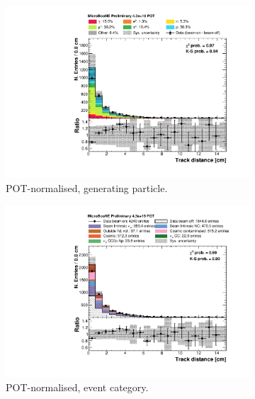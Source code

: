 \begin{figure}[htbp]
\centering
  \begin{subfigure}{0.49\textwidth}
    \includegraphics[width=\linewidth]{figures/h_track_distance_pdg.pdf}
    \caption{POT-normalised, generating particle.} \label{fig:trackd_pdg}
  \end{subfigure}
  \begin{subfigure}{0.49\textwidth}
    \includegraphics[width=\linewidth]{figures/h_track_distance.pdf}
    \caption{POT-normalised, event category.} \label{fig:trackd_pot}
  \end{subfigure}
  \begin{subfigure}{0.49\textwidth}

\end{subfigure}
\end{figure}

